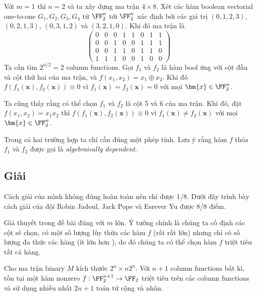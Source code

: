 \begin{example}
    Với $m=1$ thì $n=2$ và ta xây dựng ma trận $4 \times 8$. Xét các hàm boolean vectorial one-to-one $G_1, G_2, G_3, G_4$ từ $\FF_2^n$ tới $\FF_2^n$ xác định bởi các giá trị $(0, 1, 2, 3)$, $(0, 2, 1, 3)$, $(0, 3, 1, 2)$ và $(3, 2, 1, 0)$. Khi đó ma trận là
    \begin{equation*}
        \begin{pmatrix}
            0 & 0 & 0 & 1 & 1 & 0 & 1 & 1 \\
            0 & 0 & 1 & 0 & 0 & 1 & 1 & 1 \\
            0 & 0 & 1 & 1 & 0 & 1 & 1 & 0 \\
            1 & 1 & 1 & 0 & 0 & 1 & 0 & 0
        \end{pmatrix}
    \end{equation*}
    Ta cần tìm $2^{n/2} = 2$ column functions. Gọi $f_1$ và $f_2$ là hàm bool ứng với cột đầu và cột thứ hai của ma trận, và $f(x_1, x_2) = x_1 \oplus x_2$. Khi đó $f(f_1(\bm{x}), f_2(\bm{x})) \equiv 0$ vì $f_1(\bm{x}) = f_2(\bm{x}) = 0$ với mọi $\bm{x} \in \FF_2^n$.

    Ta cũng thấy rằng có thể chọn $f_1$ và $f_2$ là cột 5 và 6 của ma trận. Khi đó, đặt $f(x_1, x_2) = x_1 x_2$ thì $f(f_1(\bm{x}), f_2(\bm{x})) \equiv 0$ vì $f_1(\bm{x}) \neq f_2(\bm{x})$ với mọi $\bm{x} \in \FF_2^n$.

    Trong cả hai trường hợp ta chỉ cần đúng một phép tính. Lưu ý rằng hàm $f$ thỏa $f_1$ và $f_2$ được gọi là \textit{algebraically dependent}.
\end{example}

\subsection*{Giải}

Cách giải của mình không đúng hoàn toàn nên chỉ được 1/8. Dưới đây trình bày cách giải của đội Robin Jadoul, Jack Pope và Esrever Yu được 8/8 điểm.

Giả thuyết trong đề bài đúng với $m$ lớn. Ý tưởng chính là chúng ta cố định các cột sẽ chọn, có một số lượng lũy thừa các hàm $f$ (rất rất lớn) nhưng chỉ có số lượng đa thức các hàng (ít lớn hơn ), do đó chúng ta có thể chọn hàm $f$ triệt tiêu tất cả hàng.

\begin{theorem}
    Cho ma trận binary $M$ kích thước $2^n \times n 2^n$. Với $n+1$ column functions bất kì, tồn tại một hàm nonzero $f: \FF_2^{n+1} \to \FF_2$ triệt tiêu trên các column functions và sử dụng nhiều nhất $2n + 1$ toán tử cộng và nhân.
\end{theorem}

